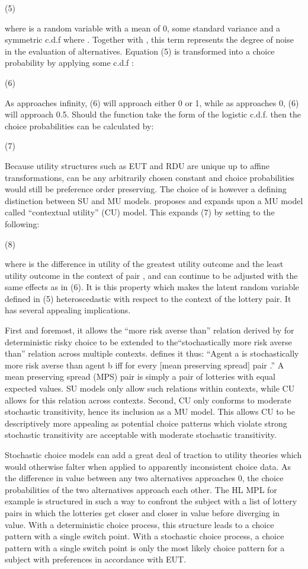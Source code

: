 \documentclass[../main.tex]{subfiles}
\begin{document}
		(5)

where  is a random variable with a mean of 0, some standard variance and a symmetric c.d.f  where .
Together with , this term represents the degree of noise in the evaluation of alternatives.
Equation (5) is transformed into a choice probability by applying some c.d.f :

		(6)

As  approaches infinity, (6) will approach either 0 or 1, while as  approaches 0, (6) will approach 0.5.
Should the function  take the form of the logistic c.d.f. then the choice probabilities can be calculated by:

		(7)

Because utility structures such as EUT and RDU are unique up to affine transformations,  can be any arbitrarily chosen constant and choice probabilities would still be preference order preserving.
The choice of  is however a defining distinction between SU and MU models.
\textcite{Wilcox2008} proposes and \textcite{Wilcox2011} expands upon a MU model called \enquote{contextual utility} (CU) model. This expands (7) by setting  to the following:

		(8)

where  is the difference in utility of the greatest utility outcome and the least utility outcome in the context of pair , and  can continue to be adjusted with the same effects as  in (6).
It is this property which makes the latent random variable defined in (5) heteroscedastic with respect to the context of the lottery pair.
It has several appealing implications.


First and foremost, it allows the \enquote{more risk averse than} relation derived by \textcite{Pratt1964} for deterministic risky choice to be extended to the\enquote{stochastically more risk averse than} relation across multiple contexts.
\textcite[89]{Wilcox2011} defines it thus: \enquote{Agent a is stochastically more risk averse than agent b \textelp{} iff  for every [mean preserving spread] pair .}
A mean preserving spread (MPS) pair is simply a pair of lotteries with equal expected values.
SU models only allow such relations within contexts, while CU allows for this relation across contexts.
Second, CU only conforms to moderate stochastic transitivity, hence its inclusion as a MU model.
This allows CU to be descriptively more appealing as potential choice patterns which violate strong stochastic transitivity are acceptable with moderate stochastic transitivity.

Stochastic choice models can add a great deal of traction to utility theories which would otherwise falter when applied to apparently inconsistent choice data.
As the difference in value between any two alternatives approaches 0, the choice probabilities of the two alternatives approach each other.
The HL MPL for example is structured in such a way to confront the subject with a list of lottery pairs in which the lotteries get closer and closer in value before diverging in value.
With a deterministic choice process, this structure leads to a choice pattern with a single switch point.
With a stochastic choice process, a choice pattern with a single switch point is only the most likely choice pattern for a subject with preferences in accordance with EUT. 
\end{document}
